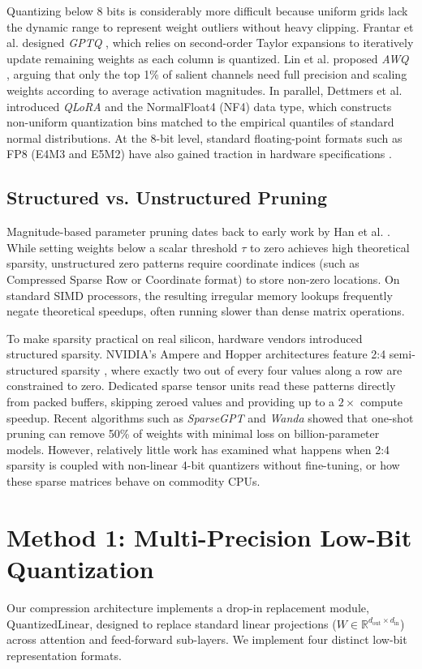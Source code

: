 \documentclass[conference]{IEEEtran}
\begin{document}
Quantizing below 8 bits is considerably more difficult because uniform grids lack the dynamic range to represent weight outliers without heavy clipping. Frantar et al. designed \textit{GPTQ} \cite{frantar2022gptq}, which relies on second-order Taylor expansions to iteratively update remaining weights as each column is quantized. Lin et al. proposed \textit{AWQ} \cite{lin2023awq}, arguing that only the top 1\% of salient channels need full precision and scaling weights according to average activation magnitudes. In parallel, Dettmers et al. introduced \textit{QLoRA} \cite{dettmers2024qlora} and the NormalFloat4 (NF4) data type, which constructs non-uniform quantization bins matched to the empirical quantiles of standard normal distributions. At the 8-bit level, standard floating-point formats such as FP8 (E4M3 and E5M2) have also gained traction in hardware specifications \cite{micikevicius2022fp8}.

\subsection{Structured vs. Unstructured Pruning}
Magnitude-based parameter pruning dates back to early work by Han et al. \cite{han2015learning}. While setting weights below a scalar threshold $\tau$ to zero achieves high theoretical sparsity, unstructured zero patterns require coordinate indices (such as Compressed Sparse Row or Coordinate format) to store non-zero locations. On standard SIMD processors, the resulting irregular memory lookups frequently negate theoretical speedups, often running slower than dense matrix operations.

To make sparsity practical on real silicon, hardware vendors introduced structured sparsity. NVIDIA's Ampere and Hopper architectures feature 2:4 semi-structured sparsity \cite{mishra2021accelerating, pool2021channel}, where exactly two out of every four values along a row are constrained to zero. Dedicated sparse tensor units read these patterns directly from packed buffers, skipping zeroed values and providing up to a $2\times$ compute speedup. Recent algorithms such as \textit{SparseGPT} \cite{frantar2023sparsegpt} and \textit{Wanda} \cite{sun2023simple} showed that one-shot pruning can remove 50\% of weights with minimal loss on billion-parameter models. However, relatively little work has examined what happens when 2:4 sparsity is coupled with non-linear 4-bit quantizers without fine-tuning, or how these sparse matrices behave on commodity CPUs.

\section{Method 1: Multi-Precision Low-Bit Quantization}
\label{sec:method1}
Our compression architecture implements a drop-in replacement module, $\text{QuantizedLinear}$, designed to replace standard linear projections ($W \in \mathbb{R}^{d_{\text{out}} \times d_{\text{in}}}$) across attention and feed-forward sub-layers. We implement four distinct low-bit representation formats.
\end{document}
